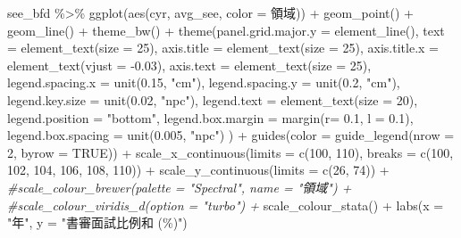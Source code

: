 \documentclass[
]{article}
\newenvironment{Shaded}{\begin{snugshade}}{\end{snugshade}}
\newcommand{\AttributeTok}[1]{\textcolor[rgb]{0.77,0.63,0.00}{#1}}
\newcommand{\CommentTok}[1]{\textcolor[rgb]{0.56,0.35,0.01}{\textit{#1}}}
\newcommand{\ConstantTok}[1]{\textcolor[rgb]{0.00,0.00,0.00}{#1}}
\newcommand{\DecValTok}[1]{\textcolor[rgb]{0.00,0.00,0.81}{#1}}
\newcommand{\FloatTok}[1]{\textcolor[rgb]{0.00,0.00,0.81}{#1}}
\newcommand{\FunctionTok}[1]{\textcolor[rgb]{0.00,0.00,0.00}{#1}}
\newcommand{\NormalTok}[1]{#1}
\newcommand{\SpecialCharTok}[1]{\textcolor[rgb]{0.00,0.00,0.00}{#1}}
\newcommand{\StringTok}[1]{\textcolor[rgb]{0.31,0.60,0.02}{#1}}
\begin{document}
\begin{Shaded}
\begin{Highlighting}[]
\NormalTok{see\_bfd }\SpecialCharTok{\%\textgreater{}\%}
  \FunctionTok{ggplot}\NormalTok{(}\FunctionTok{aes}\NormalTok{(cyr, avg\_see, }\AttributeTok{color =}\NormalTok{ 領域)) }\SpecialCharTok{+}
  \FunctionTok{geom\_point}\NormalTok{() }\SpecialCharTok{+}
  \FunctionTok{geom\_line}\NormalTok{() }\SpecialCharTok{+}
  \FunctionTok{theme\_bw}\NormalTok{() }\SpecialCharTok{+}
  \FunctionTok{theme}\NormalTok{(}\AttributeTok{panel.grid.major.y =} \FunctionTok{element\_line}\NormalTok{(), }
        \AttributeTok{text =} \FunctionTok{element\_text}\NormalTok{(}\AttributeTok{size =} \DecValTok{25}\NormalTok{), }
        \AttributeTok{axis.title =} \FunctionTok{element\_text}\NormalTok{(}\AttributeTok{size =} \DecValTok{25}\NormalTok{),}
        \AttributeTok{axis.title.x =} \FunctionTok{element\_text}\NormalTok{(}\AttributeTok{vjust =} \SpecialCharTok{{-}}\FloatTok{0.03}\NormalTok{),}
        \AttributeTok{axis.text =} \FunctionTok{element\_text}\NormalTok{(}\AttributeTok{size =} \DecValTok{25}\NormalTok{),}
        \AttributeTok{legend.spacing.x =} \FunctionTok{unit}\NormalTok{(}\FloatTok{0.15}\NormalTok{, }\StringTok{"cm"}\NormalTok{),}
        \AttributeTok{legend.spacing.y =} \FunctionTok{unit}\NormalTok{(}\FloatTok{0.2}\NormalTok{, }\StringTok{"cm"}\NormalTok{),}
        \AttributeTok{legend.key.size =} \FunctionTok{unit}\NormalTok{(}\FloatTok{0.02}\NormalTok{, }\StringTok{"npc"}\NormalTok{),}
        \AttributeTok{legend.text =} \FunctionTok{element\_text}\NormalTok{(}\AttributeTok{size =} \DecValTok{20}\NormalTok{),}
        \AttributeTok{legend.position =} \StringTok{"bottom"}\NormalTok{,}
        \AttributeTok{legend.box.margin =} \FunctionTok{margin}\NormalTok{(}\AttributeTok{r=} \FloatTok{0.1}\NormalTok{, }\AttributeTok{l =} \FloatTok{0.1}\NormalTok{),}
        \AttributeTok{legend.box.spacing =} \FunctionTok{unit}\NormalTok{(}\FloatTok{0.005}\NormalTok{, }\StringTok{"npc"}\NormalTok{)}
\NormalTok{        ) }\SpecialCharTok{+}
  \FunctionTok{guides}\NormalTok{(}\AttributeTok{color =} \FunctionTok{guide\_legend}\NormalTok{(}\AttributeTok{nrow =} \DecValTok{2}\NormalTok{, }\AttributeTok{byrow =} \ConstantTok{TRUE}\NormalTok{)) }\SpecialCharTok{+}
  \FunctionTok{scale\_x\_continuous}\NormalTok{(}\AttributeTok{limits =} \FunctionTok{c}\NormalTok{(}\DecValTok{100}\NormalTok{, }\DecValTok{110}\NormalTok{), }\AttributeTok{breaks =} \FunctionTok{c}\NormalTok{(}\DecValTok{100}\NormalTok{, }\DecValTok{102}\NormalTok{, }\DecValTok{104}\NormalTok{, }\DecValTok{106}\NormalTok{, }\DecValTok{108}\NormalTok{, }\DecValTok{110}\NormalTok{)) }\SpecialCharTok{+}
  \FunctionTok{scale\_y\_continuous}\NormalTok{(}\AttributeTok{limits =} \FunctionTok{c}\NormalTok{(}\DecValTok{26}\NormalTok{, }\DecValTok{74}\NormalTok{)) }\SpecialCharTok{+}
  \CommentTok{\#scale\_colour\_brewer(palette = "Spectral", name = "領域") +}
  \CommentTok{\#scale\_colour\_viridis\_d(option = "turbo") +}
  \FunctionTok{scale\_colour\_stata}\NormalTok{() }\SpecialCharTok{+}
  \FunctionTok{labs}\NormalTok{(}\AttributeTok{x =} \StringTok{"年"}\NormalTok{, }\AttributeTok{y =} \StringTok{"書審面試比例和 (\%)"}\NormalTok{)}
\end{Highlighting}
\end{Shaded}
\end{document}
